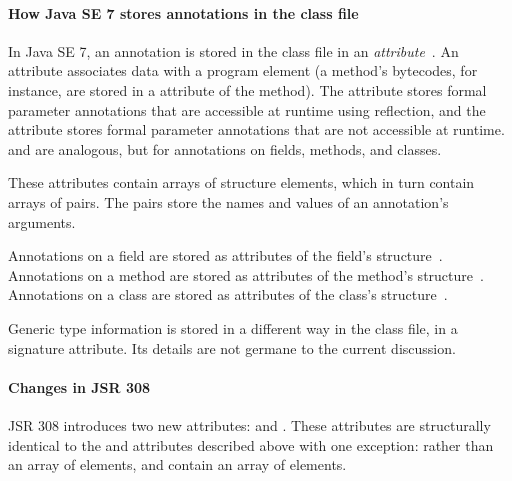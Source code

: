 \documentclass[10pt]{article}
\begin{document}


\paragraph{How Java SE 7 stores annotations in the class file}


In Java SE 7, an annotation is stored in the class file in an
\emph{attribute}~\cite{JSR175,LindholmYBB2012}.  An attribute 
associates data with a program element (a
method's bytecodes, for instance, are stored in a 
attribute of the method). The \RuntimeVisibleParameterAnnotations attribute
stores formal parameter annotations that are accessible at runtime using
reflection, and the
\RuntimeInvisibleParameterAnnotations attribute stores formal parameter annotations
that are not accessible at runtime.
\RuntimeVisibleAnnotations and 
\RuntimeInvisibleAnnotations are analogous, but for annotations on fields,
methods, and classes.

These attributes contain arrays of
 structure elements, which in turn contain arrays of
 pairs.  The  pairs store
the names and values of an annotation's arguments.

Annotations on a field are stored as attributes of the field's 
 structure~\cite[\S 4.6]{LindholmYBB2012}.
Annotations on a method are stored as attributes of the method's
 structure~\cite[\S 4.7]{LindholmYBB2012}.
Annotations on a class are stored as attributes of the class's
 structure~\cite[\S 4.2]{LindholmYBB2012}.

Generic type information is stored in a different way in the class file, in
a signature attribute.  Its details are not germane to the current
discussion.


\paragraph{Changes in JSR 308}
JSR 308 introduces two new attributes:
\RuntimeVisibleTypeAnnotations and
\RuntimeInvisibleTypeAnnotations. These attributes are
structurally identical to the \RuntimeVisibleAnnotations and
\RuntimeInvisibleAnnotations attributes described above with one
exception: rather than an array of  elements,
\RuntimeVisibleTypeAnnotations and
\RuntimeInvisibleTypeAnnotations contain an array of
\extendedannotation elements.
\end{document}
